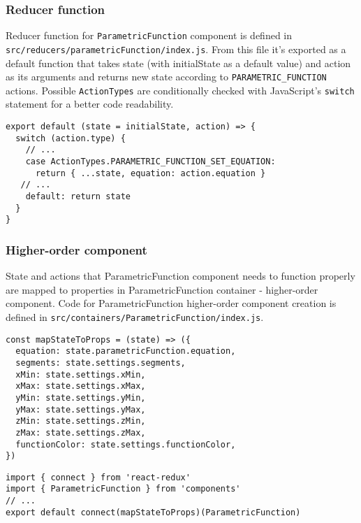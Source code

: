 \subsubsection{Reducer function}
Reducer function for \texttt{ParametricFunction} component is defined in \texttt{src/reducers/parametricFunction/index.js}. From this file it's exported as a default function that takes state (with initialState as a default value) and action as its arguments and returns new state according to \texttt{PARAMETRIC_FUNCTION} actions. Possible \texttt{ActionTypes} are conditionally checked with JavaScript's \texttt{switch} statement for a better code readability.

\begin{lstlisting}[caption={Update the \texttt{state.parametricFunction.equation} value with the new one from action payload when action of type \texttt{PARAMETRIC_FUNCTION_SET_EQUATION} is dispatched.},captionpos=b]
export default (state = initialState, action) => {
  switch (action.type) {
    // ...
    case ActionTypes.PARAMETRIC_FUNCTION_SET_EQUATION:
      return { ...state, equation: action.equation }
   // ...
    default: return state
  }
}
\end{lstlisting}

\subsubsection{Higher-order component}
State and actions that ParametricFunction component needs to function properly are mapped to properties in ParametricFunction container - higher-order component. Code for ParametricFunction higher-order component creation is defined in \texttt{src/containers/ParametricFunction/index.js}.

\begin{lstlisting}[caption={Function to map \texttt{parametricFunction}  and \texttt{settings} state to component properties.},captionpos=b]
const mapStateToProps = (state) => ({
  equation: state.parametricFunction.equation,
  segments: state.settings.segments,
  xMin: state.settings.xMin,
  xMax: state.settings.xMax,
  yMin: state.settings.yMin,
  yMax: state.settings.yMax,
  zMin: state.settings.zMin,
  zMax: state.settings.zMax,
  functionColor: state.settings.functionColor,
})
\end{lstlisting}

\begin{lstlisting}[caption={Creation of \texttt{ParametricFunction} higher-order component.},captionpos=b]
import { connect } from 'react-redux'
import { ParametricFunction } from 'components'
// ...
export default connect(mapStateToProps)(ParametricFunction)
\end{lstlisting}

